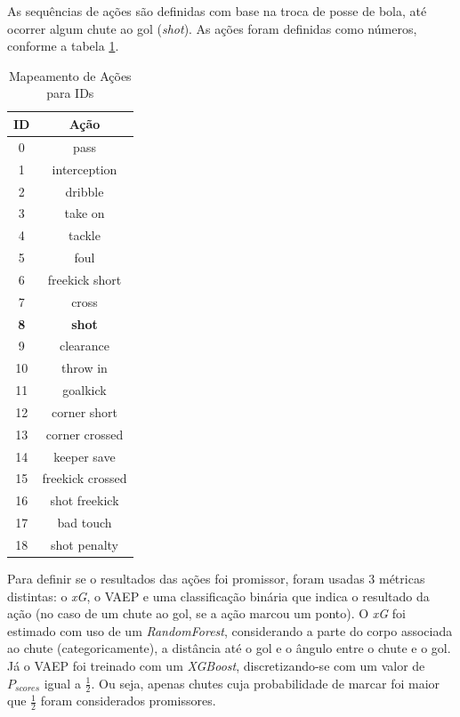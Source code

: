 \documentclass{article}
\begin{document}
As sequências de ações são definidas com base na troca de posse de bola, até
ocorrer algum chute ao gol (\textit{shot}). As ações foram definidas como números, conforme a
tabela \ref{tab:id_to_action_map}.

\begin{table}[H]
	\centering
	\begin{tabular}{|c|c|}
		\hline
		\textbf{ID}            & \textbf{Ação}
		\\ \hline
		0 & pass
		\\ \hline
		1 & interception
		\\ \hline
		2 & dribble
		\\ \hline
		3 & take on
		\\ \hline
		4 & tackle
		\\ \hline
		5 & foul
		\\ \hline
		6 & freekick short
		\\ \hline
		7 & cross
		\\ \hline
		\textbf{8} & \textbf{shot}
		\\ \hline
		9 & clearance
		\\ \hline
		10 & throw in
		\\ \hline
		11 & goalkick
		\\ \hline
		12 & corner short
		\\ \hline
		13 & corner crossed
		\\ \hline
		14 & keeper save
		\\ \hline
		15 & freekick crossed
		\\ \hline
		16 & shot freekick
		\\ \hline
		17 & bad touch
		\\ \hline
		18 & shot penalty
		\\ \hline
	\end{tabular}
	\caption{Mapeamento de Ações para IDs}
	\label{tab:id_to_action_map}
\end{table}

Para definir se o resultados das ações foi promissor, foram usadas 3 métricas
distintas: o \textit{xG}, o VAEP e uma classificação binária que indica o
resultado da ação (no caso de um chute ao gol, se a ação marcou um ponto). O
\textit{xG} foi estimado com uso de um \textit{RandomForest}, considerando a
parte do corpo associada ao chute (categoricamente), a distância até o gol e o
ângulo entre o chute e o gol. Já o VAEP foi treinado com um \textit{XGBoost},
discretizando-se com um valor de $P_{scores}$ igual a $\frac{1}{2}$. Ou seja,
apenas chutes cuja probabilidade de marcar foi maior que $\frac{1}{2}$ foram
considerados promissores.
\end{document}
